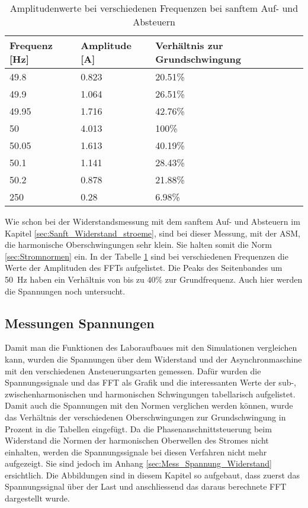 \begin{table}[ht!]
	\centering
	\begin{tabular}{|l|l|l|}
		\hline
		Frequenz {[}Hz{]} & Amplitude {[}A{]} & Verhältnis zur Grundschwingung	\\ \hline
		49.8              & 0.823             & 20.51\%							\\ \hline
		49.9              & 1.064             & 26.51\%							\\ \hline
		49.95             & 1.716             & 42.76\%							\\ \hline
		50                & 4.013             & 100\%							\\ \hline
		50.05             & 1.613             & 40.19\%							\\ \hline
		50.1              & 1.141             & 28.43\%							\\ \hline
		50.2              & 0.878             & 21.88\%							\\ \hline
		250               & 0.28              & 6.98\%							\\ \hline
	\end{tabular}
	\caption{Amplitudenwerte bei verschiedenen Frequenzen bei sanftem Auf- und Absteuern}\label{tab:Sanft_langsam_ASM_stroeme}
\end{table}
Wie schon bei der Widerstandsmessung mit dem sanftem Auf- und Absteuern im Kapitel \ref{sec:Sanft_Widerstand_stroeme}, sind bei dieser Messung, mit der ASM, die harmonische Oberschwingungen sehr klein. Sie halten somit die Norm \ref{sec:Stromnormen} ein. In der Tabelle \ref{tab:Sanft_langsam_ASM_stroeme} sind bei verschiedenen Frequenzen die Werte der Amplituden des FFTs aufgelistet.
Die Peaks des Seitenbandes um \SI{50}{Hz} haben ein Verhältnis von bis zu 40\% zur Grundfrequenz. Auch hier werden die Spannungen noch untersucht. 


\newpage
\subsection{Messungen Spannungen}

Damit man die Funktionen des Laboraufbaues mit den Simulationen vergleichen kann, wurden die Spannungen über dem Widerstand und der Asynchronmaschine mit den verschiedenen Ansteuerungsarten gemessen. Dafür wurden die Spannungssignale und das FFT als Grafik und die interessanten Werte der sub-, zwischenharmonischen und harmonischen Schwingungen tabellarisch aufgelistet. Damit auch die Spannungen mit den Normen verglichen werden können, wurde das Verhältnis der verschiedenen Oberschwingungen zur Grundschwingung in Prozent in die Tabellen eingefügt. Da die Phasenanschnittsteuerung beim Widerstand die Normen der harmonischen Oberwellen des Stromes nicht einhalten, werden die Spannungssignale bei diesen Verfahren nicht mehr aufgezeigt. Sie sind jedoch im Anhang \ref{sec:Mess_Spannung_Widerstand} ersichtlich. Die Abbildungen sind in diesem Kapitel so aufgebaut, dass zuerst das Spannungssignal über der Last und anschliessend das daraus berechnete FFT dargestellt wurde.

